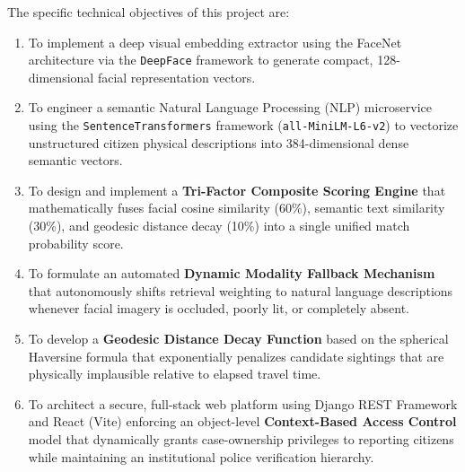 \documentclass[12pt,a4paper]{report}
\begin{document}
The specific technical objectives of this project are:
\begin{enumerate}
    \item To implement a deep visual embedding extractor using the FaceNet architecture via the \texttt{DeepFace} framework to generate compact, 128-dimensional facial representation vectors.
    \item To engineer a semantic Natural Language Processing (NLP) microservice using the \texttt{SentenceTransformers} framework (\texttt{all-MiniLM-L6-v2}) to vectorize unstructured citizen physical descriptions into 384-dimensional dense semantic vectors.
    \item To design and implement a \textbf{Tri-Factor Composite Scoring Engine} that mathematically fuses facial cosine similarity (60\%), semantic text similarity (30\%), and geodesic distance decay (10\%) into a single unified match probability score.
    \item To formulate an automated \textbf{Dynamic Modality Fallback Mechanism} that autonomously shifts retrieval weighting to natural language descriptions whenever facial imagery is occluded, poorly lit, or completely absent.
    \item To develop a \textbf{Geodesic Distance Decay Function} based on the spherical Haversine formula that exponentially penalizes candidate sightings that are physically implausible relative to elapsed travel time.
    \item To architect a secure, full-stack web platform using Django REST Framework and React (Vite) enforcing an object-level \textbf{Context-Based Access Control} model that dynamically grants case-ownership privileges to reporting citizens while maintaining an institutional police verification hierarchy.
\end{enumerate}
\end{document}
